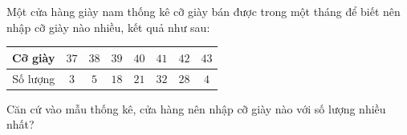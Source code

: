 \begin{ex}
Một cửa hàng giày nam thống kê cỡ giày bán được trong một tháng để biết nên nhập cỡ giày nào nhiều, kết quả như sau:
\begin{center}
\begin{tabular}{|c|c|c|c|c|c|c|c|}\hline
Cỡ giày & $37$ & $38$ & $39$ & $40$ & $41$ & $42$ & $43$\\\hline
Số lượng & $3$ & $5$ & $18$ & $21$ & $32$ & $28$ & $4$\\\hline
\end{tabular}
\end{center}
Căn cứ vào mẫu thống kê, cửa hàng nên nhập cỡ giày nào với số lượng nhiều nhất?
\end{ex}
